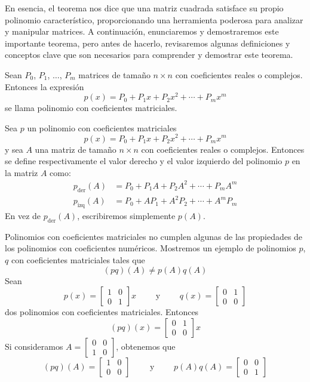 En esencia, el teorema nos dice que una matriz cuadrada satisface su propio polinomio característico, proporcionando una herramienta poderosa para analizar y manipular matrices. A continuación, enunciaremos y demostraremos este importante teorema, pero antes de hacerlo, revisaremos algunas definiciones y conceptos clave que son necesarios para comprender y demostrar este teorema.

\begin{definition}
    Sean $P_0$, $P_1$, $\dots$, $P_m$ matrices de tamaño $n \times n$ con coeficientes reales o complejos. Entonces la expresión
    $$p(x) = P_0 + P_1x + P_2x^2 + \cdots + P_mx^m$$
    se llama polinomio con coeficientes matriciales.
\end{definition}

\begin{definition}
    Sea $p$ un polinomio con coeficientes matriciales
    $$p(x) = P_0 + P_1x + P_2x^2 + \cdots + P_mx^m$$
    y sea $A$ una matriz de tamaño $n \times n$ con coeficientes reales o complejos. Entonces se define respectivamente el valor derecho y el valor izquierdo del polinomio $p$ en la matriz $A$ como:
    \begin{align*}
        p_{\operatorname{der}}(A) & = P_0 + P_1A + P_2A^2 + \cdots + P_mA^m \\
        p_{\operatorname{izq}}(A) & = P_0 + AP_1 + A^2P_2 + \cdots + A^mP_m
    \end{align*}
    En vez de $p_{\operatorname{der}}(A)$, escribiremos simplemente $p(A)$.
\end{definition}

\begin{example}
    Polinomios con coeficientes matriciales no cumplen algunas de las propiedades de los polinomios con coeficientes  numéricos. Mostremos un ejemplo de polinomios $p$, $q$ con coeficientes matriciales tales que
    $$(pq)(A) \neq p(A)q(A)$$
    Sean
    $$p(x) = \begin{bmatrix}
        1 & 0 \\
        0 & 1
    \end{bmatrix}x \qquad \text{ y } \qquad q(x) = \begin{bmatrix}
        0 & 1 \\
        0 & 0
    \end{bmatrix}$$
    dos polinomios con coeficientes matriciales. Entonces
    $$(pq)(x) = \begin{bmatrix}
        0 & 1 \\
        0 & 0
    \end{bmatrix}x$$
    Si consideramos $A = \begin{bmatrix}
        0 & 0 \\
        1 & 0
    \end{bmatrix}$, obtenemos que
    $$(pq)(A) = \begin{bmatrix}
        1 & 0 \\
        0 & 0
    \end{bmatrix} \qquad \text{ y } \qquad p(A)q(A) = \begin{bmatrix}
        0 & 0 \\
        0 & 1
    \end{bmatrix}$$
\end{example}

